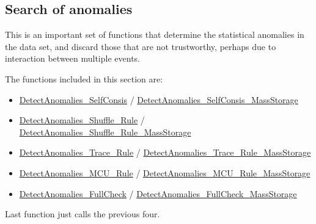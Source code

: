 \subsection{Search of anomalies}\label{Subsec:SearchOfAnomalies}

This is an important set of functions that determine the statistical anomalies in the data set, and discard those that are not trustworthy, perhaps due to interaction between multiple events. 

The functions included in this section are:

\begin{itemize}
	\item  \hyperref[Fun:DetectAnomaliesSelfConsis]{DetectAnomalies\_SelfConsis} / \hyperref[Fun:DetectAnomaliesSelfConsis_MassStorage]{DetectAnomalies\_SelfConsis\_MassStorage}
	\item  \hyperref[Fun:DetectAnomaliesShuffleRule]{DetectAnomalies\_Shuffle\_Rule} / \hyperref[Fun:DetectAnomaliesShuffleRule_MassStorage]{DetectAnomalies\_Shuffle\_Rule\_MassStorage}
	\item  \hyperref[Fun:DetectAnomaliesTraceRule]{DetectAnomalies\_Trace\_Rule} / \hyperref[Fun:DetectAnomaliesTraceRule_MassStorage]{DetectAnomalies\_Trace\_Rule\_MassStorage}
	\item  \hyperref[Fun:DetectAnomaliesMCURule]{DetectAnomalies\_MCU\_Rule} / \hyperref[Fun:DetectAnomaliesMCURule_MassStorage]{DetectAnomalies\_MCU\_Rule\_MassStorage}
	\item  \hyperref[Fun:DetectAnomaliesFullCheck]{DetectAnomalies\_FullCheck} / \hyperref[Fun:DetectAnomaliesFullCheck_MassStorage]{DetectAnomalies\_FullCheck\_MassStorage}
\end{itemize}

Last function just calls the previous four.

